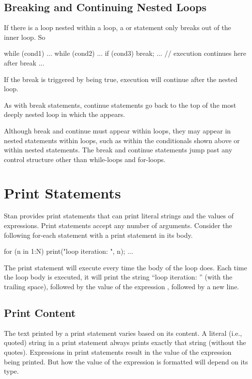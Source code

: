 \subsection{Breaking and Continuing Nested Loops}

If there is a loop nested within a loop, a  or
 statement only breaks out of the inner loop. So
%
\begin{stancode}
while (cond1) {
  ...
  while (cond2) {
    ...
    if (cond3) break;
    ...
  }
  // execution continues here after break
  ...
}
\end{stancode}
%
If the break is triggered by  being true, execution will
continue after the nested loop.

As with break statements, continue statements go back to the top of
the most deeply nested loop in which the  appears.  

Although break and continue must appear within loops, they may appear
in nested statements within loops, such as within the conditionals
shown above or within nested statements.  The break and continue
statements jump past any control structure other than while-loops and
for-loops.

\section{Print Statements}\label{print-statements.section}

Stan provides print statements that can print literal strings and the
values of expressions.  Print statements accept any number of
arguments.  Consider the following for-each statement with a print
statement in its body.
%
\begin{stancode}
for (n in 1:N) { print("loop iteration: ", n); ... }
\end{stancode}
%
The print statement will execute every time the body of the loop does.
Each time the loop body is executed, it will print the string ``loop iteration:
'' (with the trailing space), followed by the value of the expression
, followed by a new line.

\subsection{Print Content}

The text printed by a print statement varies based on its content.  A
literal (i.e., quoted) string in a print statement always prints
exactly that string (without the quotes).  Expressions in print
statements result in the value of the expression being printed.
But how the value of the expression is formatted will depend on its type.

